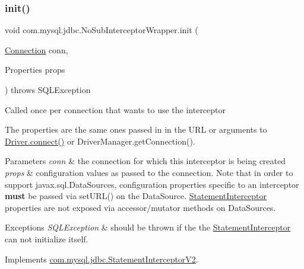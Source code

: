 \subsubsection{\texorpdfstring{init()}{init()}}
{\footnotesize\ttfamily void com.\+mysql.\+jdbc.\+No\+Sub\+Interceptor\+Wrapper.\+init (\begin{DoxyParamCaption}\item[{\mbox{\hyperlink{interfacecom_1_1mysql_1_1jdbc_1_1_connection}{Connection}}}]{conn,  }\item[{Properties}]{props }\end{DoxyParamCaption}) throws S\+Q\+L\+Exception}

Called once per connection that wants to use the interceptor

The properties are the same ones passed in in the U\+RL or arguments to \mbox{\hyperlink{classcom_1_1mysql_1_1jdbc_1_1_non_registering_driver_a834c012e752a01d1ee435b3461bb8218}{Driver.\+connect()}} or Driver\+Manager.\+get\+Connection().


\begin{DoxyParams}{Parameters}
{\em conn} & the connection for which this interceptor is being created \\
\hline
{\em props} & configuration values as passed to the connection. Note that in order to support javax.\+sql.\+Data\+Sources, configuration properties specific to an interceptor {\bfseries must} be passed via set\+U\+R\+L() on the Data\+Source. \mbox{\hyperlink{interfacecom_1_1mysql_1_1jdbc_1_1_statement_interceptor}{Statement\+Interceptor}} properties are not exposed via accessor/mutator methods on Data\+Sources.\\
\hline
\end{DoxyParams}

\begin{DoxyExceptions}{Exceptions}
{\em S\+Q\+L\+Exception} & should be thrown if the the \mbox{\hyperlink{interfacecom_1_1mysql_1_1jdbc_1_1_statement_interceptor}{Statement\+Interceptor}} can not initialize itself. \\
\hline
\end{DoxyExceptions}


Implements \mbox{\hyperlink{interfacecom_1_1mysql_1_1jdbc_1_1_statement_interceptor_v2_ae2d3d924826dcf4a4e025433af0b4d8f}{com.\+mysql.\+jdbc.\+Statement\+Interceptor\+V2}}.

